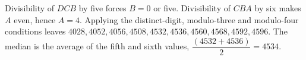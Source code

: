 Divisibility of $DCB$ by five forces $B=0$ or five. Divisibility of $CBA$ by six makes $A$ even, hence $A=4$. Applying the distinct-digit, modulo-three and modulo-four conditions leaves $4028,4052,4056,4508,4532,4536,4560,4568,4592,4596$. The median is the average of the fifth and sixth values, $\dfrac{(4532+4536)}{2}=\boxed{4534}$.
